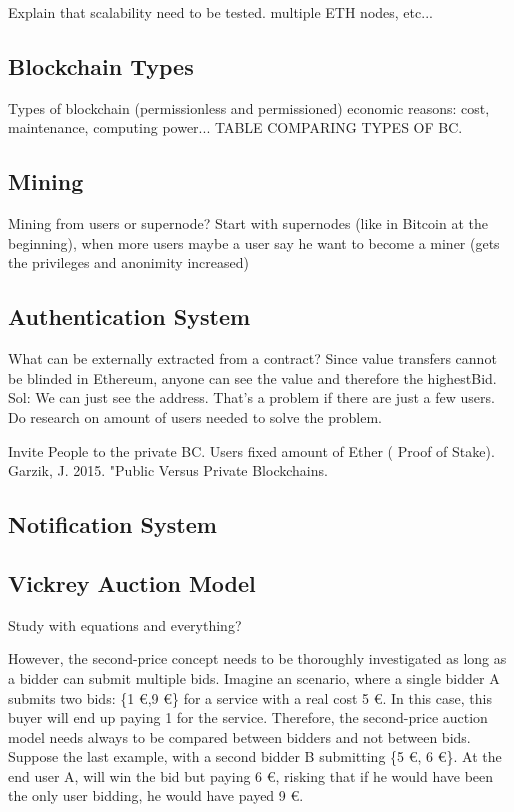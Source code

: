 Explain that scalability need to be tested. multiple ETH nodes, etc...

\subsection{Blockchain Types}

Types of blockchain (permissionless and permissioned) economic reasons: cost, maintenance, computing power...  TABLE COMPARING TYPES OF BC.

\subsection{Mining}

Mining from users or supernode? Start with supernodes (like in Bitcoin at the beginning), when more users maybe a user say he want to become a miner (gets the privileges and anonimity increased)

\subsection{Authentication System}

What can be externally extracted from a contract? Since value transfers cannot be blinded in Ethereum, anyone can see the value and therefore the highestBid. Sol: We can just see the address. That's a problem if there are just a few users. Do research on amount of users needed to solve the problem.

Invite People to the private BC. Users fixed amount of Ether ( Proof of Stake). Garzik, J. 2015. "Public Versus Private Blockchains.

\subsection{Notification System}


\subsection{Vickrey Auction Model}

Study \citep{ausubel2006lovely} with equations and everything?

However, the second-price concept needs to be thoroughly investigated as long as a bidder can submit multiple bids. Imagine an scenario, where a single bidder A submits two bids: \{1 \euro,9 \euro\} for a service with a real cost 5 \euro. In this case, this buyer will end up paying 1 for the service. Therefore, the second-price auction model needs always to be compared between bidders and not between bids. Suppose the last example, with a second bidder B submitting \{5 \euro, 6 \euro\}. At the end user A, will win the bid but paying 6 \euro, risking that if he would have been the only user bidding, he would have payed 9 \euro.

